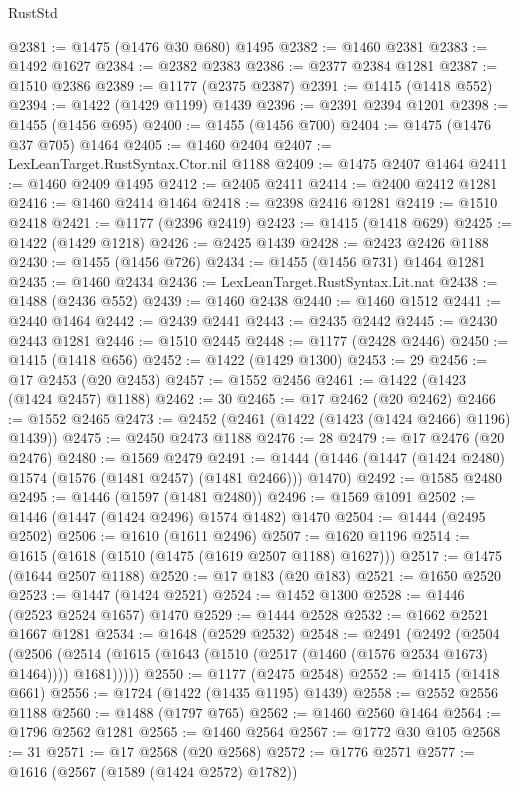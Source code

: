 \begin{lexlean}{RustStd}
\begin{coremodule}
@2381 := @1475 (@1476 @30 @680) @1495
@2382 := @1460 @2381
@2383 := @1492 @1627
@2384 := @2382 @2383
@2386 := @2377 @2384 @1281
@2387 := @1510 @2386
@2389 := @1177 (@2375 @2387)
@2391 := @1415 (@1418 @552)
@2394 := @1422 (@1429 @1199) @1439
@2396 := @2391 @2394 @1201
@2398 := @1455 (@1456 @695)
@2400 := @1455 (@1456 @700)
@2404 := @1475 (@1476 @37 @705) @1464
@2405 := @1460 @2404
@2407 := LexLeanTarget.RustSyntax.Ctor.nil @1188
@2409 := @1475 @2407 @1464
@2411 := @1460 @2409 @1495
@2412 := @2405 @2411
@2414 := @2400 @2412 @1281
@2416 := @1460 @2414 @1464
@2418 := @2398 @2416 @1281
@2419 := @1510 @2418
@2421 := @1177 (@2396 @2419)
@2423 := @1415 (@1418 @629)
@2425 := @1422 (@1429 @1218)
@2426 := @2425 @1439
@2428 := @2423 @2426 @1188
@2430 := @1455 (@1456 @726)
@2434 := @1455 (@1456 @731) @1464 @1281
@2435 := @1460 @2434
@2436 := LexLeanTarget.RustSyntax.Lit.nat
@2438 := @1488 (@2436 @552)
@2439 := @1460 @2438
@2440 := @1460 @1512
@2441 := @2440 @1464
@2442 := @2439 @2441
@2443 := @2435 @2442
@2445 := @2430 @2443 @1281
@2446 := @1510 @2445
@2448 := @1177 (@2428 @2446)
@2450 := @1415 (@1418 @656)
@2452 := @1422 (@1429 @1300)
@2453 := 29
@2456 := @17 @2453 (@20 @2453)
@2457 := @1552 @2456
@2461 := @1422 (@1423 (@1424 @2457) @1188)
@2462 := 30
@2465 := @17 @2462 (@20 @2462)
@2466 := @1552 @2465
@2473 := @2452 (@2461 (@1422 (@1423 (@1424 @2466) @1196) @1439))
@2475 := @2450 @2473 @1188
@2476 := 28
@2479 := @17 @2476 (@20 @2476)
@2480 := @1569 @2479
@2491 := @1444 (@1446 (@1447 (@1424 @2480) @1574 (@1576 (@1481 @2457) (@1481 @2466))) @1470)
@2492 := @1585 @2480
@2495 := @1446 (@1597 (@1481 @2480))
@2496 := @1569 @1091
@2502 := @1446 (@1447 (@1424 @2496) @1574 @1482) @1470
@2504 := @1444 (@2495 @2502)
@2506 := @1610 (@1611 @2496)
@2507 := @1620 @1196
@2514 := @1615 (@1618 (@1510 (@1475 (@1619 @2507 @1188) @1627)))
@2517 := @1475 (@1644 @2507 @1188)
@2520 := @17 @183 (@20 @183)
@2521 := @1650 @2520
@2523 := @1447 (@1424 @2521)
@2524 := @1452 @1300
@2528 := @1446 (@2523 @2524 @1657) @1470
@2529 := @1444 @2528
@2532 := @1662 @2521 @1667 @1281
@2534 := @1648 (@2529 @2532)
@2548 := @2491
    (@2492
      (@2504
        (@2506 (@2514 (@1615 (@1643 (@1510 (@2517 (@1460 (@1576 @2534 @1673) @1464)))) @1681)))))
@2550 := @1177 (@2475 @2548)
@2552 := @1415 (@1418 @661)
@2556 := @1724 (@1422 (@1435 @1195) @1439)
@2558 := @2552 @2556 @1188
@2560 := @1488 (@1797 @765)
@2562 := @1460 @2560 @1464
@2564 := @1796 @2562 @1281
@2565 := @1460 @2564
@2567 := @1772 @30 @105
@2568 := 31
@2571 := @17 @2568 (@20 @2568)
@2572 := @1776 @2571
@2577 := @1616 (@2567 (@1589 (@1424 @2572) @1782))

\end{coremodule}
\end{lexlean}
